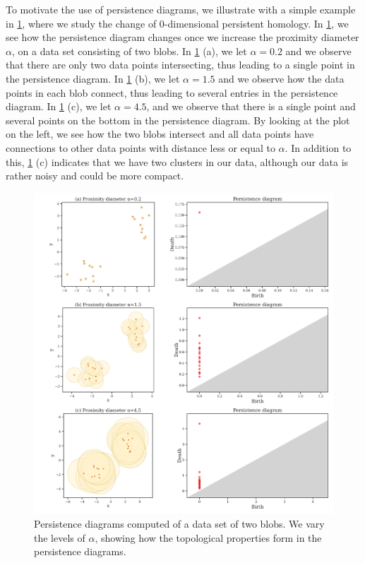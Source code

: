 To motivate the use of persistence diagrams, we illustrate with a simple example in \cref{fig:persistence-diagram-example}, where we study the change of 0-dimensional persistent homology. In \cref{fig:persistence-diagram-example}, we see how the persistence diagram changes once we increase the proximity diameter $\alpha$, on a data set consisting of two blobs. In \cref{fig:persistence-diagram-example} (a), we let $\alpha=0.2$ and we observe that there are only two data points intersecting, thus leading to a single point in the persistence diagram. In \cref{fig:persistence-diagram-example} (b), we let $\alpha=1.5$ and we observe how the data points in each blob connect, thus leading to several entries in the persistence diagram. In \cref{fig:persistence-diagram-example} (c), we let $\alpha=4.5$, and we observe that there is a single point and several points on the bottom in the persistence diagram. By looking at the plot on the left, we see how the two blobs intersect and all data points have connections to other data points with distance less or equal to $\alpha$. In addition to this, \cref{fig:persistence-diagram-example} (c) indicates that we have two clusters in our data, although our data is rather noisy and could be more compact.
\begin{figure}[H]
    \centering
    \includegraphics[width=1\textwidth]{thesis/figures/persistence-diagram-example.pdf}
    \caption{Persistence diagrams computed of a data set of two blobs. We vary the levels of $\alpha$, showing how the topological properties form in the persistence diagrams.}
    \label{fig:persistence-diagram-example}
\end{figure}
